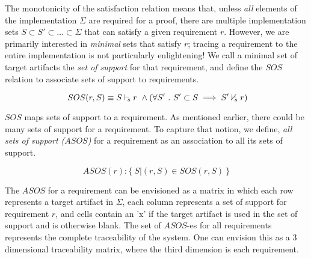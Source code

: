 



The monotonicity of the satisfaction relation means that, unless {\em all} elements of the implementation $\Sigma$ are required for a proof, there are multiple implementation sets $S \subset S' \subset \ldots \subset \Sigma$ that can satisfy a given requirement $r$.  However, we are primarily interested in {\em minimal} sets that satisfy $r$; tracing a requirement to the entire implementation is not particularly enlightening!  We call a minimal set of target artifacts the \emph{set of support} for that requirement, and define the $SOS$ relation to associate sets of support to requirements.

$$ \ SOS(r, S) \equiv S \vdash_{\!\!s} r~\land (\forall S'\ .\ S' \subset S \implies S' \nvdash_{\!\!s} r) $$

$SOS$ maps sets of support to a requirement. As mentioned earlier, there could be many sets of support for a requirement. To capture that notion, we define, \emph{all sets of support ($ASOS$)} for a requirement as an association to all its sets of support.

$$ ASOS(r) : \{\ S | (r,S) \in SOS(r,S)\ \} $$

The $ASOS$ for a requirement can be envisioned as a matrix in which each row represents a target artifact in $\Sigma$, each column represents a set of support for requirement $r$, and cells contain an 'x' if the target artifact is used in the set of support and is otherwise blank.
%
The set of $ASOS$-es for all requirements represents the complete traceability of the system. One can envision this as a 3 dimensional traceability matrix, where the third dimension is each requirement.


